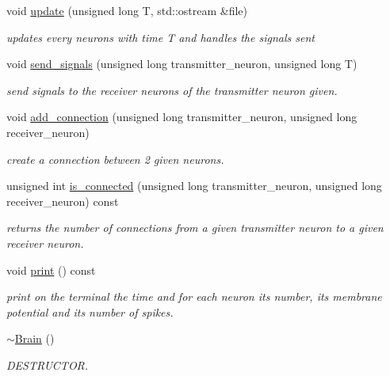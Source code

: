 \begin{DoxyCompactItemize}
void \hyperlink{classBrain_aa3cb8a4b80bf16c0c2b29586473cbc8f}{update} (unsigned long T, std\-::ostream \&file)
\begin{DoxyCompactList}\small\item\em updates every neurons with time T and handles the signals sent \end{DoxyCompactList}\item 
void \hyperlink{classBrain_a20c01b0942abcbb178c8325ad792cac2}{send\-\_\-signals} (unsigned long transmitter\-\_\-neuron, unsigned long T)
\begin{DoxyCompactList}\small\item\em send signals to the receiver neurons of the transmitter neuron given. \end{DoxyCompactList}\item 
void \hyperlink{classBrain_a1c4a9ec9389ee20c135851a5ad761e49}{add\-\_\-connection} (unsigned long transmitter\-\_\-neuron, unsigned long receiver\-\_\-neuron)
\begin{DoxyCompactList}\small\item\em create a connection between 2 given neurons. \end{DoxyCompactList}\item 
unsigned int \hyperlink{classBrain_a079be244ae24c5a4313d72632310b12d}{is\-\_\-connected} (unsigned long transmitter\-\_\-neuron, unsigned long receiver\-\_\-neuron) const 
\begin{DoxyCompactList}\small\item\em returns the number of connections from a given transmitter neuron to a given receiver neuron. \end{DoxyCompactList}\item 
\hypertarget{classBrain_ae4e1953862ed8bc1a6c1db955dea4052}{void \hyperlink{classBrain_ae4e1953862ed8bc1a6c1db955dea4052}{print} () const }\label{classBrain_ae4e1953862ed8bc1a6c1db955dea4052}

\begin{DoxyCompactList}\small\item\em print on the terminal the time and for each neuron its number, its membrane potential and its number of spikes. \end{DoxyCompactList}\item 
\hypertarget{classBrain_af41db0fbf20565d17d36bad299ae0cac}{\hyperlink{classBrain_af41db0fbf20565d17d36bad299ae0cac}{$\sim$\-Brain} ()}\label{classBrain_af41db0fbf20565d17d36bad299ae0cac}

\begin{DoxyCompactList}\small\item\em D\-E\-S\-T\-R\-U\-C\-T\-O\-R. \end{DoxyCompactList}\end{DoxyCompactItemize}


